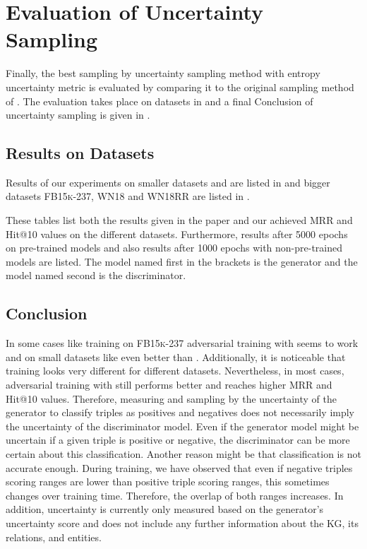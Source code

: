 \section{Evaluation of Uncertainty Sampling}
\label{ch:evaluation:sec:evaluation_uncertainty}
%
Finally, the best sampling by uncertainty sampling method \ussoftmax with entropy uncertainty metric is evaluated by comparing it to the original sampling method \origsampling of \kbgan.
The evaluation takes place on datasets in  and a final Conclusion of uncertainty sampling is given in .
%
\subsection{Results on Datasets} \label{subsec:results_uncertainty}




%
Results of our experiments on smaller datasets \umls and \kinship  are listed in  and bigger datasets \textsc{FB15k-237},  \textsc{WN18} and \textsc{WN18RR} are listed in .


These tables list both the results given in the \kbgan paper \cite{cai2017kbgan} and our achieved MRR and Hit@10 values on the different datasets.
Furthermore, results after 5000 epochs on pre-trained models and also results after 1000 epochs with non-pre-trained models are listed.
The model named first in the brackets is the generator and the model named second is the discriminator.


\subsection{Conclusion}
\label{subsec:uncertainty_conclusion}
%
In some cases like training on \textsc{FB15k-237} adversarial training with \ussoftmax seems to work and on small datasets like \umls even better than \origsampling.
Additionally, it is noticeable that training looks very different for different datasets.
Nevertheless, in most cases, adversarial training with \origsampling still performs better and reaches higher MRR and Hit@10 values.
Therefore, measuring and sampling by the uncertainty of the generator to classify triples as positives and negatives does not necessarily imply the uncertainty of the discriminator model.
Even if the generator model might be uncertain if a given triple is positive or negative, the discriminator can be more certain about this classification.
Another reason might be that classification is not accurate enough.
During training, we have observed that even if negative triples scoring ranges are lower than positive triple scoring ranges, this sometimes changes over training time.
Therefore, the overlap of both ranges increases.
In addition, uncertainty is currently only measured based on the generator's uncertainty score and does not include any further information about the \ac{KG}, its relations, and entities.